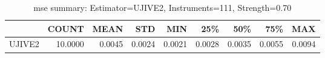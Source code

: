 \begin{table}[ht]
\centering
\caption{mse summary: Estimator=UJIVE2, Instruments=111, Strength=0.70}
\begin{tabular}{lrrrrrrrr}
\toprule
 & COUNT & MEAN & STD & MIN & 25\% & 50\% & 75\% & MAX \\
\midrule
UJIVE2 & 10.0000 & 0.0045 & 0.0024 & 0.0021 & 0.0028 & 0.0035 & 0.0055 & 0.0094 \\
\bottomrule
\end{tabular}
\end{table}

